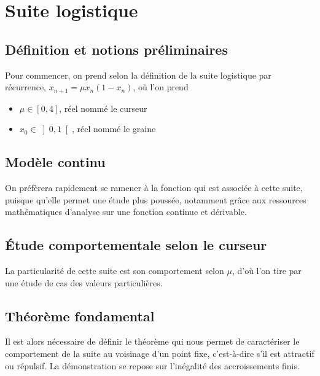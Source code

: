 %
%

\section{Suite logistique}
\subsection{Définition et notions préliminaires}
Pour commencer, on prend selon la définition de la suite logistique
par récurrence, $ x_{n+1} = \mu x_n(1 - x_n) $, où l'on prend 
\begin{itemize}
\item $\mu \in \left[0,4\right] $, réel nommé le curseur
\item $ x_{0} \in \left]0,1\right[ $, réel nommé le graine
\end{itemize}

\subsection{Modèle continu}
On préfèrera rapidement se ramener à la fonction qui est associée à cette suite,
puisque qu'elle permet une étude plus poussée, notamment grâce aux ressources mathématiques
d'analyse sur une fonction continue et dérivable.
\subsection{Étude comportementale selon le curseur}
La particularité de cette suite est son comportement selon $ \mu $,
d'où l'on tire par une étude de cas des valeurs particulières.
\subsection{Théorème fondamental}
Il est alors nécessaire de définir le théorème qui nous permet de 
caractériser le comportement de la suite au voisinage d'un point fixe,
c'est-à-dire s'il est attractif ou répulsif. La démonstration se
repose sur l'inégalité des accroissements finis.

